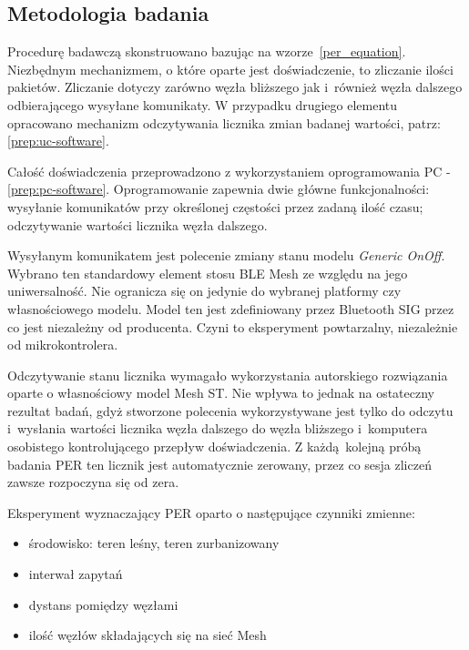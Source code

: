 \subsection{Metodologia badania} \label{subsubsec:test-procedure}

Procedurę badawczą skonstruowano bazując na wzorze~\ref{per_equation}. Niezbędnym mechanizmem, o które oparte
jest doświadczenie, to zliczanie ilości pakietów. Zliczanie dotyczy zarówno węzła bliższego 
jak i~również węzła dalszego odbierającego wysyłane komunikaty. W przypadku drugiego elementu 
opracowano mechanizm odczytywania licznika zmian badanej wartości, patrz: \ref{prep:uc-software}.

Całość doświadczenia przeprowadzono z wykorzystaniem oprogramowania PC - \ref{prep:pc-software}. Oprogramowanie
zapewnia dwie główne funkcjonalności: wysyłanie komunikatów przy określonej częstości przez zadaną ilość czasu;
odczytywanie wartości licznika węzła dalszego.

Wysyłanym komunikatem jest polecenie zmiany stanu modelu
\textit{Generic OnOff}. Wybrano ten standardowy element stosu BLE Mesh ze względu na jego uniwersalność.
Nie ogranicza się on jedynie do wybranej platformy czy własnościowego modelu. Model ten jest zdefiniowany
przez Bluetooth SIG przez co jest niezależny od producenta. Czyni to eksperyment powtarzalny,
niezależnie od mikrokontrolera.

Odczytywanie stanu licznika wymagało wykorzystania autorskiego rozwiązania oparte o własnościowy model Mesh
ST. Nie wpływa to jednak na ostateczny rezultat badań, gdyż stworzone polecenia wykorzystywane jest
tylko do odczytu i~wysłania wartości licznika węzła dalszego do węzła bliższego i~komputera osobistego kontrolującego
przepływ doświadczenia. Z każdą kolejną próbą badania PER ten licznik jest automatycznie zerowany,
przez co sesja zliczeń zawsze rozpoczyna się od zera.

Eksperyment wyznaczający PER oparto o następujące czynniki zmienne:
\begin{itemize}
\item środowisko: teren leśny, teren zurbanizowany
\item interwał zapytań
\item dystans pomiędzy węzłami
\item ilość węzłów składających się na sieć Mesh
\end{itemize}


